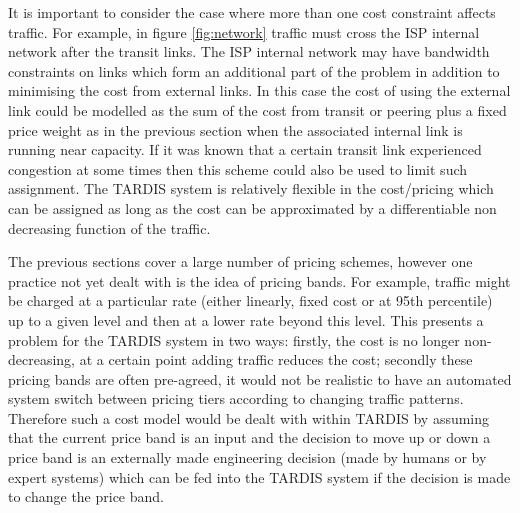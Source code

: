 It is important to consider the case where more than one
cost constraint affects traffic.  For example, in figure 
\ref{fig:network} traffic must cross the ISP internal network
after the transit links.  The ISP internal network may have bandwidth
constraints on links which form an additional part of the problem in
addition to minimising the cost from external links.  In this case
the cost of using the external link could be modelled as the sum of
the cost from transit or peering plus a fixed price weight as in 
the previous section when the associated internal link is running 
near capacity.  If it was known that a certain transit link experienced
congestion at some times then this scheme could also be used to limit
such assignment.  The TARDIS system is relatively flexible in the
cost/pricing which can be assigned as long as the cost can be 
approximated by a differentiable non decreasing function of the
traffic.

The previous sections cover a large number of pricing schemes, however
one practice not yet dealt with is the idea of pricing bands.
For example, traffic might be charged at a particular rate (either 
linearly, fixed cost or at 95th percentile) up to a given level and then at a
lower rate beyond this level.  This presents a problem for the
TARDIS system in two ways: firstly, the cost is no longer non-decreasing,
at a certain point adding traffic reduces the cost; secondly these
pricing bands are often pre-agreed, it would not be realistic to have
an automated system switch between pricing tiers according to changing 
traffic patterns.  Therefore such a cost model would be dealt with
within TARDIS by assuming that the current price band is an input and
the decision to move up or down a price band is an externally made
engineering decision (made by humans or by expert systems) which can
be fed into the TARDIS system if the decision is made to change the 
price band.


